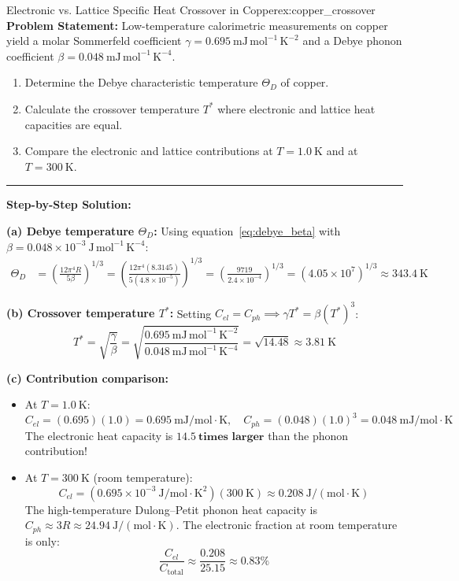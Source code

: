 \documentclass[11pt,a4paper]{article}
\begin{document}
\begin{examplebox}{Electronic vs. Lattice Specific Heat Crossover in Copper}{ex:copper_crossover}
\textbf{Problem Statement:}
Low-temperature calorimetric measurements on copper yield a molar Sommerfeld coefficient $\gamma = 0.695\ \mathrm{mJ\,mol^{-1}\,K^{-2}}$ and a Debye phonon coefficient $\beta = 0.048\ \mathrm{mJ\,mol^{-1}\,K^{-4}}$.
\begin{enumerate}[label=(\alph*)]
    \item Determine the Debye characteristic temperature $\Theta_D$ of copper.
    \item Calculate the crossover temperature $T^*$ where electronic and lattice heat capacities are equal.
    \item Compare the electronic and lattice contributions at $T = 1.0\ \mathrm{K}$ and at $T = 300\ \mathrm{K}$.
\end{enumerate}

\vspace{0.2cm}\hrule\vspace{0.2cm}
\textbf{Step-by-Step Solution:}

\textbf{(a) Debye temperature $\Theta_D$:}
Using equation~\eqref{eq:debye_beta} with $\beta = 0.048 \times 10^{-3}\ \mathrm{J\,mol^{-1}\,K^{-4}}$:
\begin{align*}
\Theta_D &= \left( \frac{12\pi^4 R}{5\beta} \right)^{1/3} = \left( \frac{12\pi^4 (8.3145)}{5(4.8 \times 10^{-5})} \right)^{1/3} = \left( \frac{9719}{2.4 \times 10^{-4}} \right)^{1/3} = (4.05 \times 10^7)^{1/3} \approx \mathbf{343.4\ \mathrm{K}}
\end{align*}

\textbf{(b) Crossover temperature $T^*$:}
Setting $C_{el} = C_{ph} \implies \gamma T^* = \beta (T^*)^3$:
\[
T^* = \sqrt{\frac{\gamma}{\beta}} = \sqrt{\frac{0.695\ \mathrm{mJ\,mol^{-1}\,K^{-2}}}{0.048\ \mathrm{mJ\,mol^{-1}\,K^{-4}}}} = \sqrt{14.48} \approx \mathbf{3.81\ \mathrm{K}}
\]

\textbf{(c) Contribution comparison:}
\begin{itemize}
    \item At $T = 1.0\ \mathrm{K}$:
    \[
    C_{el} = (0.695)(1.0) = 0.695\ \mathrm{mJ/mol\cdot K}, \quad C_{ph} = (0.048)(1.0)^3 = 0.048\ \mathrm{mJ/mol\cdot K}
    \]
    The electronic heat capacity is $\mathbf{14.5\ \text{times larger}}$ than the phonon contribution!
    \item At $T = 300\ \mathrm{K}$ (room temperature):
    \[
    C_{el} = (0.695 \times 10^{-3}\ \mathrm{J/mol\cdot K^2})(300\ \mathrm{K}) \approx \mathbf{0.208\ \mathrm{J/(mol\cdot K)}}
    \]
    The high-temperature Dulong--Petit phonon heat capacity is $C_{ph} \approx 3R \approx \mathbf{24.94\ \mathrm{J/(mol\cdot K)}}$.
    The electronic fraction at room temperature is only:
    \[
    \frac{C_{el}}{C_{\mathrm{total}}} \approx \frac{0.208}{25.15} \approx \mathbf{0.83\%}
    \]
\end{itemize}
\end{examplebox}
\end{document}
